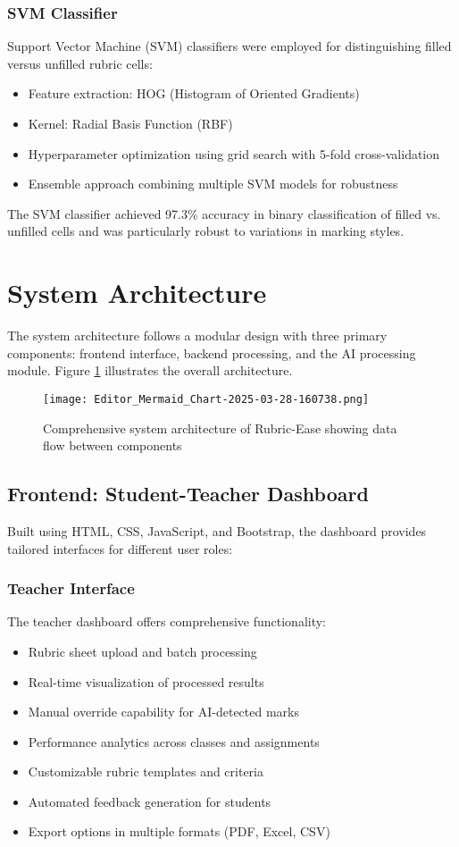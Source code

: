 \documentclass[12pt]{article}
\begin{document}
\subsubsection{SVM Classifier}
Support Vector Machine (SVM) classifiers were employed for distinguishing filled versus unfilled rubric cells:
\begin{itemize}
    \item Feature extraction: HOG (Histogram of Oriented Gradients)
    \item Kernel: Radial Basis Function (RBF)
    \item Hyperparameter optimization using grid search with 5-fold cross-validation
    \item Ensemble approach combining multiple SVM models for robustness
\end{itemize}

The SVM classifier achieved 97.3\% accuracy in binary classification of filled vs. unfilled cells and was particularly robust to variations in marking styles.

\section{System Architecture}
The system architecture follows a modular design with three primary components: frontend interface, backend processing, and the AI processing module. Figure \ref{fig:system_architecture} illustrates the overall architecture.

\begin{figure}[H]
    \centering
    \texttt{[image: Editor\_Mermaid\_Chart-2025-03-28-160738.png]}
    \caption{Comprehensive system architecture of Rubric-Ease showing data flow between components}
    \label{fig:system_architecture}
\end{figure}

\subsection{Frontend: Student-Teacher Dashboard}
Built using HTML, CSS, JavaScript, and Bootstrap, the dashboard provides tailored interfaces for different user roles:

\subsubsection{Teacher Interface}
The teacher dashboard offers comprehensive functionality:
\begin{itemize}
    \item Rubric sheet upload and batch processing
    \item Real-time visualization of processed results
    \item Manual override capability for AI-detected marks
    \item Performance analytics across classes and assignments
    \item Customizable rubric templates and criteria
    \item Automated feedback generation for students
    \item Export options in multiple formats (PDF, Excel, CSV)
\end{itemize}
\end{document}
